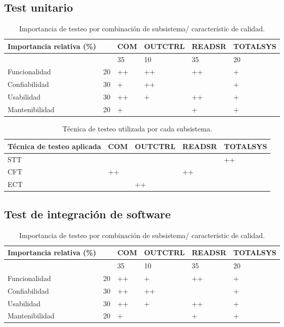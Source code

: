 \documentclass[12pt,a4paper, twosite]{article}
\begin{document}
\subsection{Test unitario}

\begin{table}[ht]
    \centering
    \begin{tabular}{|l|l|l|l|l|l|}\hline \hline
 Importancia relativa (\%)& &  COM & OUTCTRL & READSR & TOTALSYS\\
        \hline
       
           &  &35 & 10 &35 & 20                          \\
        Funcionalidad    & 20 & ++ & ++ & ++ & +		\\
        Confiabilidad    & 30 &+ &++ & &+                        \\
        Usabilidad       & 30 &++ &+ &++ &+                        \\
        Mantenibilidad   & 20 &+ & &+ &+                        \\
        \hline
    \end{tabular}
    \caption{Importancia de testeo por combinación de subsistema/ característic de calidad.}
\end{table}


\begin{table}[ht]
    \centering
    \begin{tabular}{|l|l|l|l|l|}\hline \hline
 Técnica de testeo aplicada & COM & OUTCTRL & READSR & TOTALSYS\\
        \hline
       STT & & & & ++ \\
      CFT & ++ & & ++& \\
      ECT & & ++ & &  \\
        \hline
    \end{tabular}
    \caption{Técnica de testeo utilizada por cada subsistema.}
\end{table}


\subsection{Test de integración de software}
\begin{table}[ht]
    \centering
    \begin{tabular}{|l|l|l|l|l|l|}\hline \hline
 Importancia relativa (\%)& &  COM & OUTCTRL & READSR & TOTALSYS\\
        \hline
       
            &  &35 & 10 &35 & 20                          \\
        Funcionalidad    & 20 & ++ & + & ++ & +		\\
        Confiabilidad    & 30 & ++ & ++ & & +                        \\
        Usabilidad       & 30 & ++ & + & ++ & +                        \\
        Mantenibilidad   & 20 & + & & + & +                        \\
        \hline
    \end{tabular}
    \caption{Importancia de testeo por combinación de subsistema/ característic de calidad.}
\end{table}
\end{document}
